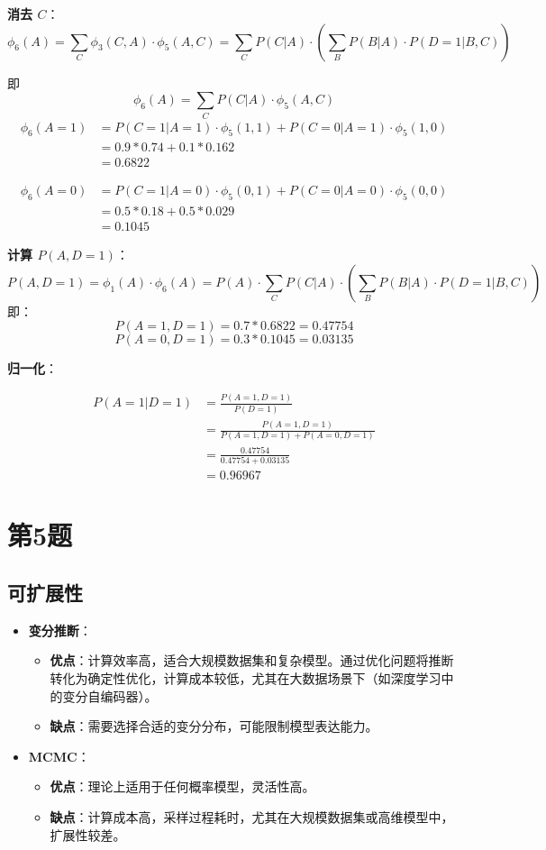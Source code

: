 \documentclass{article}
\begin{document}
\textbf{消去 \( C \)}：
\[
\phi_6(A) = \sum_{C} \phi_3(C, A) \cdot \phi_5(A, C) = \sum_{C} P(C|A) \cdot \left( \sum_{B} P(B|A) \cdot P(D=1|B,C) \right)
\]

即\[\phi_6(A)=\sum_{C}P(C|A)\cdot \phi_5(A,C)\]
\begin{align}
    \phi_6(A=1)&=P(C=1|A=1)\cdot \phi_5(1,1)+P(C=0|A=1)\cdot\phi_5(1,0)\\
    &=0.9*0.74+0.1*0.162\\
    &=0.6822
\end{align}

\begin{align}
    \phi_6(A=0)&=P(C=1|A=0)\cdot \phi_5(0,1)+P(C=0|A=0)\cdot\phi_5(0,0)\\
    &=0.5*0.18+0.5*0.029\\
    &=0.1045
\end{align}


\textbf{计算 \( P(A, D=1) \)}：
\[
P(A, D=1) = \phi_1(A) \cdot \phi_6(A) = P(A) \cdot \sum_{C} P(C|A) \cdot \left( \sum_{B} P(B|A) \cdot P(D=1|B,C) \right)
\]
即：\[P(A=1,D=1)=0.7*0.6822=0.47754\]
\[P(A=0,D=1)=0.3*0.1045=0.03135\]

\textbf{归一化}：

\begin{align}
    P(A=1|D=1)&=\frac{ P(A=1,D=1) }{P(D=1)}\\
    &=\frac{P(A=1,D=1)}{P(A=1,D=1)+P(A=0,D=1)}\\
    &=\frac{0.47754}{0.47754+0.03135}\\
    &=0.96967
\end{align}


\section*{第5题}

\subsection*{可扩展性}
\begin{itemize}
    \item \textbf{变分推断}：
    \begin{itemize}
        \item \textbf{优点}：计算效率高，适合大规模数据集和复杂模型。通过优化问题将推断转化为确定性优化，计算成本较低，尤其在大数据场景下（如深度学习中的变分自编码器）。
        \item \textbf{缺点}：需要选择合适的变分分布，可能限制模型表达能力。
    \end{itemize}
    \item \textbf{MCMC}：
    \begin{itemize}
        \item \textbf{优点}：理论上适用于任何概率模型，灵活性高。
        \item \textbf{缺点}：计算成本高，采样过程耗时，尤其在大规模数据集或高维模型中，扩展性较差。
    \end{itemize}
\end{itemize}
\end{document}

